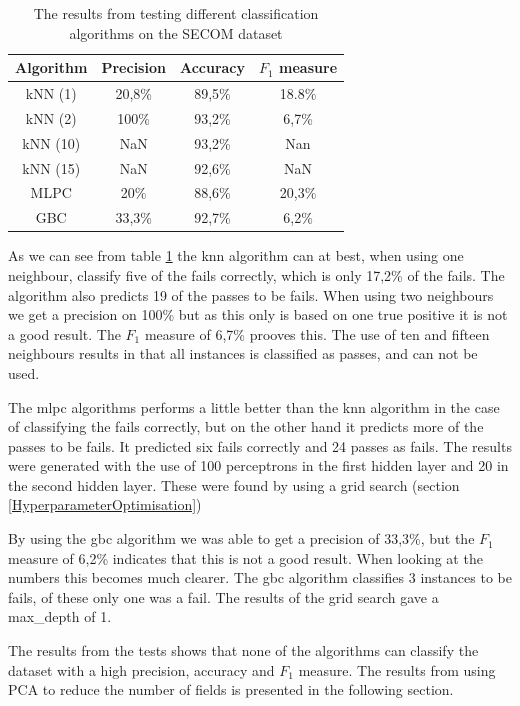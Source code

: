 \documentclass[english, a4paper]{report}
\begin{document}
{{{            \begin{table}[H]
                \centering
                \begin{tabular}{|c|c|c|c|}
                    \hline
                    \textbf{   Algorithm   } & \textbf{   Precision   } & \textbf{   Accuracy   } & \textbf{   $F_1$ measure   } \\ \hline
                     kNN (1) & 20,8\% & 89,5\% & 18.8\% \\ \hline
                     kNN (2) & 100\% & 93,2\% & 6,7\% \\ \hline
                     kNN (10) & NaN & 93,2\% & Nan \\ \hline
                     kNN (15) & NaN & 92,6\% & NaN \\ \hline
                     MLPC & 20\% & 88,6\% & 20,3\% \\ \hline
                     GBC & 33,3\% & 92,7\% & 6,2\% \\ \hline
                \end{tabular}
                \caption{The results from testing different classification algorithms on the SECOM dataset}
                \label{tab:secom-results}
            \end{table}
            
            As we can see from table \ref{tab:secom-results} the \gls{knn} algorithm can at best, when using one neighbour, classify five of the fails correctly, which is only 17,2\% of the fails. The algorithm also predicts 19 of the passes to be fails. When using two neighbours we get a precision on 100\% but as this only is based on one true positive it is not a good result. The $F_1$ measure of 6,7\% prooves this. The use of ten and fifteen neighbours results in that all instances is classified as passes, and can not be used.
            \par
            The \gls{mlpc} algorithms performs a little better than the \gls{knn} algorithm in the case of classifying the fails correctly, but on the other hand it predicts more of the passes to be fails. It predicted six fails correctly and 24 passes as fails. The results were generated with the use of 100 perceptrons in the first hidden layer and 20 in the second hidden layer. These were found by using a grid search (section \ref{HyperparameterOptimisation})
            \par
            By using the \gls{gbc} algorithm we was able to get a precision of 33,3\%, but the $F_1$ measure of 6,2\% indicates that this is not a good result. When looking at the numbers this becomes much clearer. The \gls{gbc} algorithm classifies 3 instances to be fails, of these only one was a fail. The results of the grid search gave a max\_depth of 1.
            \par
            The results from the tests shows that none of the algorithms can classify the dataset with a high precision, accuracy and $F_1$ measure. The results from using PCA to reduce the number of fields is presented in the following section. 
            
}}}
\end{document}
